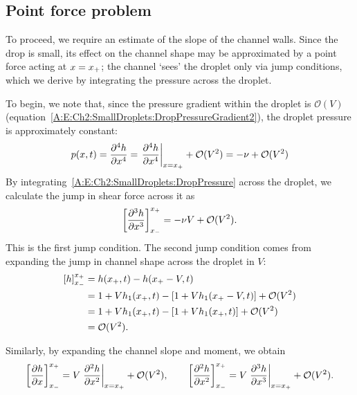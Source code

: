 \begin{subappendices}
\subsection{Point force problem}
To proceed, we require an estimate of the slope of the channel walls. Since the drop is small, its effect on the channel shape may be approximated by a point force acting at $x = x_{+}$; the channel `sees' the droplet only via jump conditions, which we derive by integrating the pressure across the droplet.

To begin, we note that, since the pressure gradient within the droplet is $\mathcal{O}(V)$ (equation~\eqref{A:E:Ch2:SmallDroplets:DropPressureGradient2}), the droplet pressure is approximately constant:
\begin{equation}\label{A:E:Ch2:SmallDroplets:DropPressure}
p(x,t) = \frac{\partial ^4 h}{\partial x^4} =  \left.\frac{\partial ^4 h}{\partial x^4}\right|_{x = x_{+}} + \mathcal{O}(V^2) = -\nu + \mathcal{O}(V^2)
\end{equation}
By integrating~\eqref{A:E:Ch2:SmallDroplets:DropPressure} across the droplet, we calculate the jump in shear force across it as
\begin{equation}\label{A:E:Ch2:SmallDroplets:ShearJump}
\left[\frac{\partial ^3 h}{\partial x^3}\right]_{x_{-}}^{x_{+}} = -\nu V + \mathcal{O}(V^2).
\end{equation}
This is the first jump condition. The second jump condition comes from expanding the jump in channel shape across the droplet in $V$:
\begin{align}
\left[h\right]_{x_{-}}^{x_{+}} &= h(x_{+},t) - h(x_{+} - V,t)  \nonumber\\
&= 1 + V h_1(x_{+},t) - \left[1 + V h_1(x_{+} - V,t)\right] + \mathcal{O}(V^2) \nonumber \\ &= 1 + V h_1(x_{+},t) - \left[1 + V h_1(x_{+},t)\right]+ \mathcal{O}(V^2)\nonumber \\&=  \mathcal{O}(V^2). \label{A:E:Ch2:SmallDroplets:ShapeSmall}
\end{align}

Similarly, by expanding the channel slope and moment, we obtain
\begin{equation}\label{A:E:Ch2:SmallDroplets:Slope_and_moment_small}
\left[\frac{\partial h}{\partial x}\right]_{x_{-}}^{x_{+}} = V\left.\frac{\partial ^2 h}{\partial x^2}\right|_{x = x_{+}} + \mathcal{O}(V^2), \qquad \left[\frac{\partial ^2 h}{\partial x^2}\right]_{x_{-}}^{x_{+}} = V\left.\frac{\partial ^3 h}{\partial x^3}\right|_{x = x_{+}} + \mathcal{O}(V^2).
\end{equation}


\end{subappendices}

